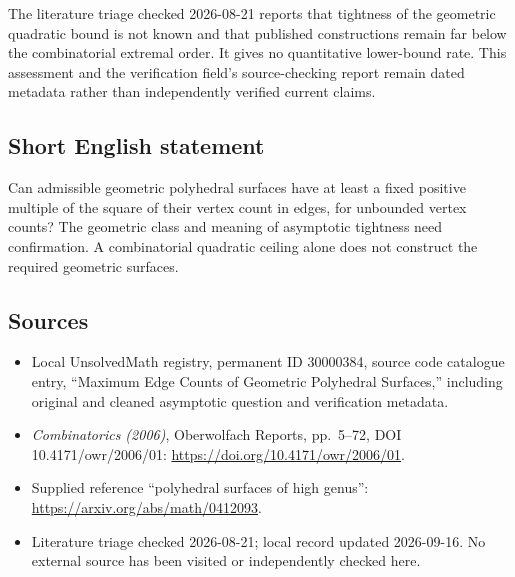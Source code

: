 \documentclass[11pt]{article}
\begin{document}
The literature triage checked 2026-08-21 reports that tightness of the geometric quadratic bound is not known and that published constructions remain far below the combinatorial extremal order. It gives no quantitative lower-bound rate. This assessment and the verification field's source-checking report remain dated metadata rather than independently verified current claims.
\subsection{Short English statement}
Can admissible geometric polyhedral surfaces have at least a fixed positive multiple of the square of their vertex count in edges, for unbounded vertex counts? The geometric class and meaning of asymptotic tightness need confirmation. A combinatorial quadratic ceiling alone does not construct the required geometric surfaces.
\subsection{Sources}
\begin{itemize}
\item Local UnsolvedMath registry, permanent ID 30000384, source code catalogue entry, ``Maximum Edge Counts of Geometric Polyhedral Surfaces,'' including original and cleaned asymptotic question and verification metadata.
\item \emph{Combinatorics (2006)}, Oberwolfach Reports, pp.\ 5--72, DOI 10.4171/owr/2006/01: \url{https://doi.org/10.4171/owr/2006/01}.
\item Supplied reference ``polyhedral surfaces of high genus'': \url{https://arxiv.org/abs/math/0412093}.
\item Literature triage checked 2026-08-21; local record updated 2026-09-16. No external source has been visited or independently checked here.
\end{itemize}
\end{document}
